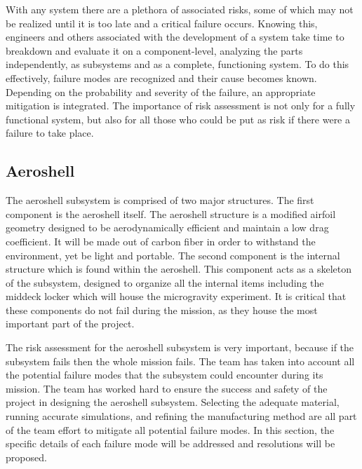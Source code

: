 \indent\indent With any system there are a plethora of associated risks, some of which may not be realized until it is too late and a critical failure occurs. Knowing this, engineers and others associated with the development of a system take time to breakdown and evaluate it on a component-level, analyzing the parts independently, as subsystems and as a complete, functioning system. To do this effectively, failure modes are recognized and their cause becomes known. Depending on the probability and severity of the failure, an appropriate mitigation is integrated. The importance of risk assessment is not only for a fully functional system, but also for all those who could be put as risk if there were a failure to take place.


\subsection{Aeroshell}

\indent\indent The aeroshell subsystem is comprised of two major structures. The first component is the aeroshell itself. The aeroshell structure is a modified airfoil geometry designed to be aerodynamically efficient and maintain a low drag coefficient. It will be made out of carbon fiber in order to withstand the environment, yet be light and portable. The second component is the internal structure which is found within the aeroshell. This component acts as a skeleton of the subsystem, designed to organize all the internal items including the middeck locker which will house the microgravity experiment. It is critical that these components do not fail during the mission, as they house the most important part of the project.

The risk assessment for the aeroshell subsystem is very important, because if the subsystem fails then the whole mission fails. The team has taken into account all the potential failure modes that the subsystem could encounter during its mission. The team has worked hard to ensure the success and safety of the project in designing the aeroshell subsystem. Selecting the adequate material, running accurate simulations, and refining the manufacturing method are all part of the team effort to mitigate all potential failure modes. In this section, the specific details of each failure mode will be addressed and resolutions will be proposed. 


